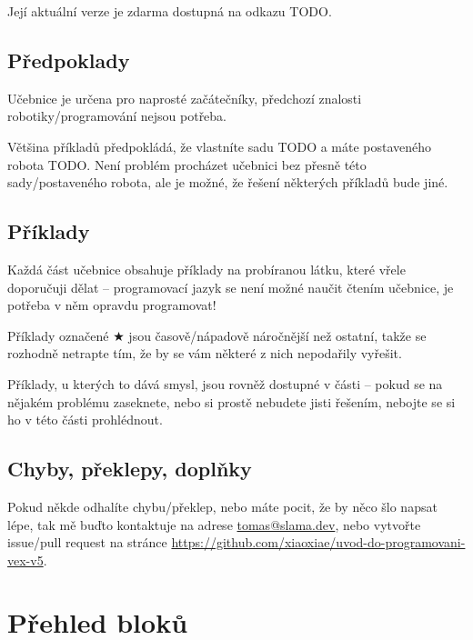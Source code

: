 Její aktuální verze je zdarma dostupná na odkazu TODO.

\subsection{Předpoklady}
Učebnice je určena pro naprosté začátečníky, předchozí znalosti robotiky/programování nejsou potřeba.

Většina příkladů předpokládá, že vlastníte sadu TODO a máte postaveného robota TODO. Není problém procházet učebnici bez přesně této sady/postaveného robota, ale je možné, že řešení některých příkladů bude jiné.

\subsection{Příklady}
Každá část učebnice obsahuje příklady na probíranou látku, které vřele doporučuji dělat -- programovací jazyk se není možné naučit čtením učebnice, je potřeba v něm opravdu programovat!

Příklady označené $\bigstar$ jsou časově/nápadově náročnější než ostatní, takže se rozhodně netrapte tím, že by se vám některé z nich nepodařily vyřešit.

Příklady, u kterých to dává smysl, jsou rovněž dostupné v části  -- pokud se na nějakém problému zaseknete, nebo si prostě nebudete jisti řešením, nebojte se si ho v této části prohlédnout.

\subsection{Chyby, překlepy, doplňky}
Pokud někde odhalíte chybu/překlep, nebo máte pocit, že by něco šlo napsat lépe, tak mě buďto kontaktuje na adrese \href{mailto:tomas@slama.dev}{tomas@slama.dev}, nebo vytvořte issue/pull request na stránce \url{https://github.com/xiaoxiae/uvod-do-programovani-vex-v5}.

\newpage

\setcounter{secnumdepth}{3}

\newpage

\newpage

\newpage

\newpage

\newpage

\newpage

\newpage
\setcounter{secnumdepth}{0}

\newcommand{\where}[1]{{\normalfont (#1)}}

\section{Přehled bloků}

